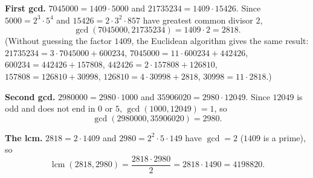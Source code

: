 \textbf{First gcd.} $7045000=1409\cdot5000$ and $21735234=1409\cdot15426$. Since $5000=2^3\cdot5^4$ and $15426=2\cdot3^2\cdot857$ have greatest common divisor $2$,
\[\gcd(7045000,21735234)=1409\cdot2=2818.\]
(Without guessing the factor $1409$, the Euclidean algorithm gives the same result: $21735234=3\cdot7045000+600234$, $7045000=11\cdot600234+442426$, $600234=442426+157808$, $442426=2\cdot157808+126810$, $157808=126810+30998$, $126810=4\cdot30998+2818$, $30998=11\cdot2818$.)

\textbf{Second gcd.} $2980000=2980\cdot1000$ and $35906020=2980\cdot12049$. Since $12049$ is odd and does not end in $0$ or $5$, $\gcd(1000,12049)=1$, so
\[\gcd(2980000,35906020)=2980.\]

\textbf{The lcm.} $2818=2\cdot1409$ and $2980=2^2\cdot5\cdot149$ have $\gcd=2$ ($1409$ is a prime), so
\[\operatorname{lcm}(2818,2980)=\dfrac{2818\cdot2980}{2}=2818\cdot1490=\boxed{4198820}.\]
